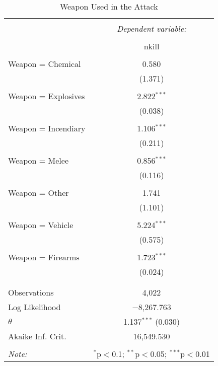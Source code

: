 
\begin{table}[!htbp] \centering 
  \caption{Weapon Used in the Attack} 
  \label{} 
\begin{tabular}{@{\extracolsep{5pt}}lc} 
\\[-1.8ex]\hline 
\hline \\[-1.8ex] 
 & \multicolumn{1}{c}{\textit{Dependent variable:}} \\ 
\cline{2-2} 
\\[-1.8ex] & nkill \\ 
\hline \\[-1.8ex] 
 Weapon = Chemical & 0.580 \\ 
  & (1.371) \\ 
  & \\ 
 Weapon = Explosives & 2.822$^{***}$ \\ 
  & (0.038) \\ 
  & \\ 
 Weapon = Incendiary & 1.106$^{***}$ \\ 
  & (0.211) \\ 
  & \\ 
 Weapon = Melee & 0.856$^{***}$ \\ 
  & (0.116) \\ 
  & \\ 
 Weapon = Other & 1.741 \\ 
  & (1.101) \\ 
  & \\ 
 Weapon = Vehicle & 5.224$^{***}$ \\ 
  & (0.575) \\ 
  & \\ 
 Weapon = Firearms & 1.723$^{***}$ \\ 
  & (0.024) \\ 
  & \\ 
\hline \\[-1.8ex] 
Observations & 4,022 \\ 
Log Likelihood & $-$8,267.763 \\ 
$\theta$ & 1.137$^{***}$  (0.030) \\ 
Akaike Inf. Crit. & 16,549.530 \\ 
\hline 
\hline \\[-1.8ex] 
\textit{Note:}  & \multicolumn{1}{r}{$^{*}$p$<$0.1; $^{**}$p$<$0.05; $^{***}$p$<$0.01} \\ 
\end{tabular} 
\end{table} 
